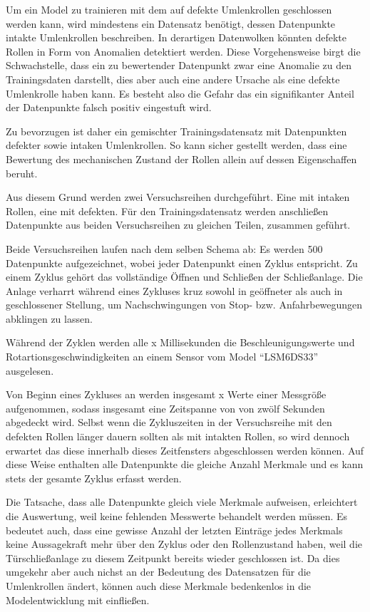 Um ein Model zu trainieren mit dem auf defekte Umlenkrollen geschlossen werden kann, wird mindestens ein Datensatz benötigt, dessen Datenpunkte intakte Umlenkrollen beschreiben. In derartigen Datenwolken könnten defekte Rollen in Form von Anomalien detektiert werden. Diese Vorgehensweise birgt die Schwachstelle, dass ein zu bewertender Datenpunkt zwar eine Anomalie zu den Trainingsdaten darstellt, dies aber auch eine andere Ursache als eine defekte Umlenkrolle haben kann. Es besteht also die Gefahr das ein signifikanter Anteil der Datenpunkte falsch positiv eingestuft wird.

Zu bevorzugen ist daher ein gemischter Trainingsdatensatz mit Datenpunkten defekter sowie intaken Umlenkrollen. So kann sicher gestellt werden, dass eine Bewertung des mechanischen Zustand der Rollen allein auf dessen Eigenschaffen beruht. 

Aus diesem Grund werden zwei Versuchsreihen durchgeführt. Eine mit intaken Rollen, eine mit defekten. Für den Trainingsdatensatz werden anschließen Datenpunkte aus beiden Versuchsreihen zu gleichen Teilen, zusammen geführt.

Beide Versuchsreihen laufen nach dem selben Schema ab:
Es werden 500 Datenpunkte aufgezeichnet, wobei jeder Datenpunkt einen Zyklus entspricht. Zu einem Zyklus gehört das vollständige Öffnen und Schließen der Schließanlage. Die Anlage verharrt während eines Zykluses kruz sowohl in geöffneter als auch in geschlossener Stellung, um Nachschwingungen von Stop- bzw. Anfahrbewegungen abklingen zu lassen.

Während der Zyklen werden alle x Millisekunden die Beschleunigungswerte und Rotartionsgeschwindigkeiten an einem Sensor vom Model \enquote{LSM6DS33} ausgelesen. 

Von Beginn eines Zykluses an werden insgesamt x Werte einer Messgröße aufgenommen, sodass insgesamt eine Zeitspanne von von zwölf Sekunden abgedeckt wird. Selbst wenn die Zykluszeiten in der Versuchsreihe mit den defekten Rollen länger dauern sollten als mit intakten Rollen, so wird dennoch erwartet das diese innerhalb dieses Zeitfensters abgeschlossen werden können. Auf diese Weise enthalten alle Datenpunkte die gleiche Anzahl Merkmale und es kann stets der gesamte Zyklus erfasst werden. 

Die Tatsache, dass alle Datenpunkte gleich viele Merkmale aufweisen, erleichtert die Auswertung, weil keine fehlenden Messwerte behandelt werden müssen. Es bedeutet auch, dass eine gewisse Anzahl der letzten Einträge jedes Merkmals keine Aussagekraft mehr über den Zyklus oder den Rollenzustand haben, weil die Türschließanlage zu diesem Zeitpunkt bereits wieder geschlossen ist. Da dies umgekehr aber auch nichst an der Bedeutung des Datensatzen für die Umlenkrollen ändert, können auch diese Merkmale bedenkenlos in die Modelentwicklung mit einfließen.

